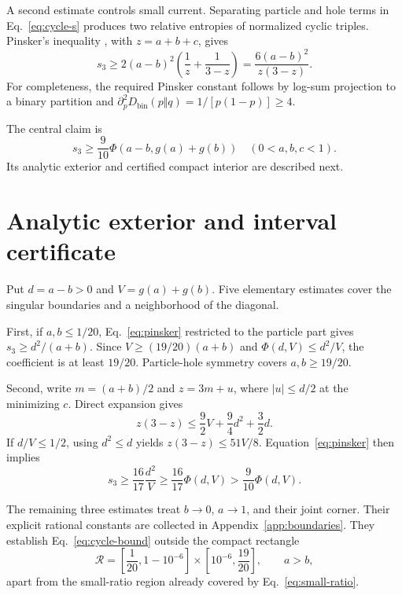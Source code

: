 \documentclass[aps,pra,reprint,superscriptaddress,nofootinbib,longbibliography,floatfix]{revtex4-2}
\newcommand{\Dkl}{D_{\mathrm{bin}}}
\newcommand{\PhiF}{\Phi}
\begin{document}
A second estimate controls small current.  Separating particle and hole terms in Eq.~\eqref{eq:cycle-s} produces two relative entropies of normalized cyclic triples.  Pinsker's inequality \cite{CoverThomas}, with $z=a+b+c$, gives
\begin{equation}
 s_3\geq2(a-b)^2\left(\frac1z+\frac1{3-z}\right)
 =\frac{6(a-b)^2}{z(3-z)}.
 \label{eq:pinsker}
\end{equation}
For completeness, the required Pinsker constant follows by log-sum projection to a binary partition and $\partial_p^2\Dkl(p\Vert q)=1/[p(1-p)]\geq4$.

The central claim is
\begin{equation}
 s_3\geq\frac9{10}\PhiF(a-b,g(a)+g(b))
 \quad (0<a,b,c<1).
 \label{eq:cycle-bound}
\end{equation}
Its analytic exterior and certified compact interior are described next.

\section{Analytic exterior and interval certificate}
\label{sec:certificate}

Put $d=a-b>0$ and $V=g(a)+g(b)$.  Five elementary estimates cover the singular boundaries and a neighborhood of the diagonal.

First, if $a,b\leq1/20$, Eq.~\eqref{eq:pinsker} restricted to the particle part gives $s_3\geq d^2/(a+b)$.  Since $V\geq(19/20)(a+b)$ and $\PhiF(d,V)\leq d^2/V$, the coefficient is at least $19/20$.  Particle-hole symmetry covers $a,b\geq19/20$.

Second, write $m=(a+b)/2$ and $z=3m+u$, where $|u|\leq d/2$ at the minimizing $c$.  Direct expansion gives
\begin{equation}
 z(3-z)\leq\frac92V+\frac94d^2+\frac32d.
\end{equation}
If $d/V\leq1/2$, using $d^2\leq d$ yields $z(3-z)\leq51V/8$.  Equation~\eqref{eq:pinsker} then implies
\begin{equation}
 s_3\geq\frac{16}{17}\frac{d^2}{V}
 \geq\frac{16}{17}\PhiF(d,V)>\frac9{10}\PhiF(d,V).
 \label{eq:small-ratio}
\end{equation}

The remaining three estimates treat $b\to0$, $a\to1$, and their joint corner.  Their explicit rational constants are collected in Appendix~\ref{app:boundaries}.  They establish Eq.~\eqref{eq:cycle-bound} outside the compact rectangle
\begin{equation}
 \mathcal R=\left[\frac1{20},1-10^{-6}\right]
 \times\left[10^{-6},\frac{19}{20}\right],\qquad a>b,
 \label{eq:rectangle}
\end{equation}
apart from the small-ratio region already covered by Eq.~\eqref{eq:small-ratio}.
\end{document}
